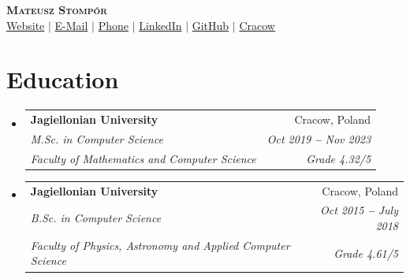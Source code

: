 \documentclass[letterpaper,11pt]{article}
\makeatletter
\newcommand{\resumeEducationHeading}[6]{
 \vspace{-2pt}\item
 \begin{tabular*}{0.97\textwidth}[t]{l@{\extracolsep{\fill}}r}
 \textbf{#1} & #2 \\
 \textit{\small#3} & \textit{\small #4} \\
 \textit{\small#5} & \textit{\small #6} \\
 \end{tabular*}\vspace{-5pt}
}
\newcommand{\resumeSubHeadingListStart}{\begin{itemize}[leftmargin=0.15in, label={}]}
\newcommand{\resumeSubHeadingListEnd}{\end{itemize}}
\makeatother
\begin{document}

\begin{center}
 \textbf{\Huge \scshape Mateusz Stompór} \\ \vspace{3pt}
 \small
 \faGlobe \hspace{.5pt} \href{https://arctic.codes}{Website}
 $|$
 \faAt \hspace{.5pt} \href{mailto:contact@arctic.codes}{E-Mail}
 $|$
 \faMobile \hspace{.5pt} \href{tel:+48503014560}{Phone}
 $|$
 \faLinkedinSquare \hspace{.5pt} \href{https://www.linkedin.com/in/mateusz-stompor}{LinkedIn}
 $|$
 \faGithub \hspace{.5pt} \href{https://github.com/mateuszstompor}{GitHub}
 $|$
 \faMapMarker \hspace{.5pt} \href{https://www.google.com/maps/place/Kraków/@50.0469018,19.8647905,11z/data=!3m1!4b1!4m5!3m4!1s0x471644c0354e18d1:0xb46bb6b576478abf!8m2!3d50.0646501!4d19.9449799}{Cracow}
\end{center}


\section{Education}
 \vspace{3pt}
 \resumeSubHeadingListStart
 \resumeEducationHeading
 {Jagiellonian University}
 {Cracow, Poland}
 {M.Sc. in Computer Science}
 {Oct 2019 \textbf{--} Nov 2023}
 {Faculty of Mathematics and Computer Science}
 {Grade 4.32/5}
 \resumeEducationHeading
 {Jagiellonian University}
 {Cracow, Poland}
 {B.Sc. in Computer Science}
 {Oct 2015 \textbf{--} July 2018}
 {Faculty of Physics, Astronomy and Applied Computer Science}
 {Grade 4.61/5}
 
 \resumeSubHeadingListEnd

\end{document}
